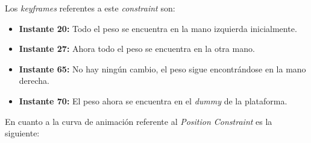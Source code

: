 Los \textit{keyframes} referentes a este \textit{constraint} son:

\begin{itemize}
    \item \textbf{Instante 20: }Todo el peso se encuentra en la mano izquierda inicialmente.
    \item \textbf{Instante 27: }Ahora todo el peso se encuentra en la otra mano.
    \item \textbf{Instante 65: }No hay ningún cambio, el peso sigue encontrándose en la mano derecha.
    \item \textbf{Instante 70: }El peso ahora se encuentra en el \textit{dummy} de la plataforma.
\end{itemize}

\bigskip

En cuanto a la curva de animación referente al \textit{Position Constraint} es la siguiente:


